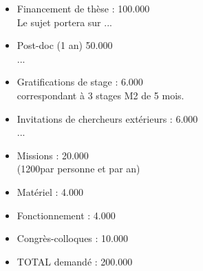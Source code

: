 \documentclass[14pt,fleqn]{article}
\begin{document}
\begin{itemize}

\item Financement de thèse : \hfill 100.000 \EUR\\
{\footnotesize Le sujet portera sur ...}
\item Post-doc (1 an) \hfill 50.000 \EUR\\
{\footnotesize ...}
\item Gratifications de stage : \hfill 6.000 \EUR\\
{\footnotesize correspondant à 3 stages M2 de 5 mois.}
\item Invitations de chercheurs extérieurs : \hfill 6.000 \EUR\\
{\footnotesize ...
}
\item Missions : \hfill 20.000 \EUR\\
{\footnotesize (1200\EUR par personne et par an)}
\item Matériel : \hfill 4.000 \EUR
\item Fonctionnement : \hfill 4.000 \EUR
\item Congrès-colloques :  \hfill 10.000 \EUR
\item TOTAL demandé : \hfill 200.000 \EUR
\end{itemize}


  

  
\end{document}
